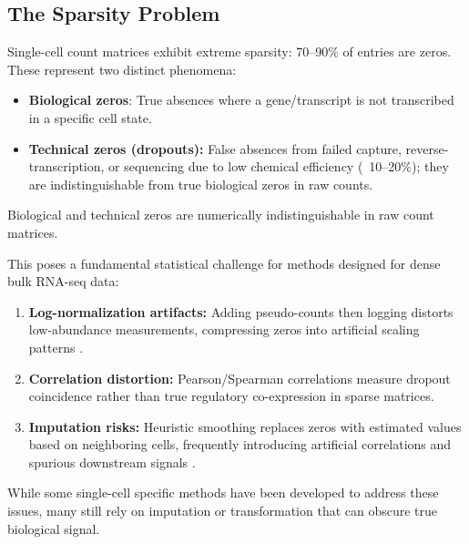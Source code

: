 \subsection{The Sparsity Problem}
Single-cell count matrices exhibit extreme sparsity: 70--90\% of entries are zeros\cite{galfre2021cotan}. These represent two distinct phenomena:
\begin{itemize}
    \item \textbf{Biological zeros}: True absences where a gene/transcript is not transcribed in a specific cell state.
    \item \textbf{Technical zeros (dropouts):} False absences from failed capture, reverse-transcription, or sequencing due to low chemical efficiency (~10--20\%); they are indistinguishable from true biological zeros in raw counts.
\end{itemize}

Biological and technical zeros are numerically indistinguishable in raw count matrices.


This poses a fundamental statistical challenge for methods designed for dense bulk RNA-seq data:

\begin{enumerate}
    \item \textbf{Log-normalization artifacts:} Adding pseudo-counts then logging distorts low-abundance measurements, compressing zeros into artificial scaling patterns \cite{galfre2021cotan}.
    
    \item \textbf{Correlation distortion:} Pearson/Spearman correlations measure dropout coincidence rather than true regulatory co-expression in sparse matrices\cite{galfre2021cotan}.
    
    \item \textbf{Imputation risks:} Heuristic smoothing replaces zeros with estimated values based on neighboring cells, frequently introducing artificial correlations and spurious downstream signals \cite{galfre2021cotan}.
\end{enumerate}

While some single-cell specific methods have been developed to address these issues, many still rely on imputation or transformation that can obscure true biological signal.


